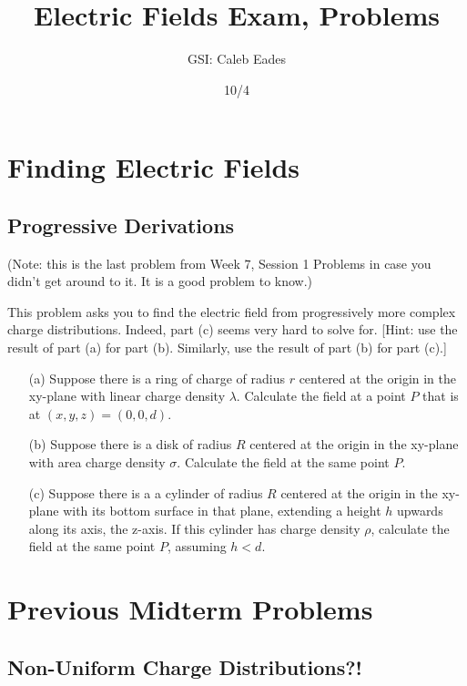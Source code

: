\documentclass{article}
\begin{document}
\title{Electric Fields Exam, Problems}
\author{GSI: Caleb Eades}
\date{10/4}
\maketitle

\section{Finding Electric Fields}

\subsection{Progressive Derivations}

(Note: this is the last problem from Week 7, Session 1 Problems in case you didn't get around to it. It is a good problem to know.)

This problem asks you to find the electric field from progressively more complex charge distributions. Indeed, part (c) seems very hard to solve for. [Hint: use the result of part (a) for part (b). Similarly, use the result of part (b) for part (c).]
\begin{itemize}
	\item[(a)] Suppose there is a ring of charge of radius $r$ centered at the origin in the xy-plane with linear charge density $\lambda$. Calculate the field at a point $P$ that is at $(x,y,z)=(0,0,d)$.
	\item[(b)] Suppose there is a disk of radius $R$ centered at the origin in the xy-plane with area charge density $\sigma$. Calculate the field at the same point $P$.
	\item[(c)] Suppose there is a a cylinder of radius $R$ centered at the origin in the xy-plane with its bottom surface in that plane, extending a height $h$ upwards along its axis, the z-axis. If this cylinder has charge density $\rho$, calculate the field at the same point $P$, assuming $h<d$.
\end{itemize}

\section{Previous Midterm Problems}

\subsection{Non-Uniform Charge Distributions?!}
\end{document}
